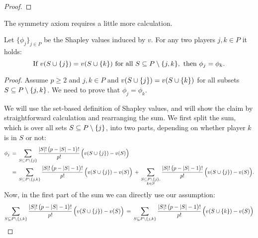 {\begin{enumerate}
\begin{proof}
    \end{proof}

    The symmetry axiom requires a little more calculation.

    \begin{theorem}[Symmetry]
    Let $\{\phi_j\}_{j \in P}$ be the Shapley values induced by $v$.
    For any two players $j,k \in P$  it holds:
    $$
    \text{If } v(S \cup \{j\}) = v(S \cup \{k\}) \text{ for all } S \subseteq P \setminus \{j,k\}, \text{ then } \phi_j = \phi_k.
    $$
    \end{theorem}

    \begin{proof}

        Assume $p \geq 2$ and $ j,k \in P$ and $v(S \cup \{j\}) = v(S \cup \{k\})$ for all subsets $S \subseteq P \setminus \{j,k\}$. We need to prove that $\phi_j = \phi_k$.
        
        We will use the set-based definition of Shapley values, and will show the claim by straightforward calculation and rearranging the sum.
        We first split the sum, which is over all sets $S \subseteq P \setminus \{j\}$, into two parts, depending on whether player $k$ is in $S$ or not:
        \begin{align*}
            \phi_j
            & \,=\, \sum_{S \subseteq P \setminus \{j\}} \frac{|S|!\,\bigl(p - |S| - 1\bigr)!}{p!} \, \Bigl( v(S \cup \{j\}) - v(S) \Bigr) \\
            & \,=\, \sum_{S \subseteq P \setminus \{j, k\}} \frac{|S|!\,\bigl(p - |S| - 1\bigr)!}{p!} \, \Bigl( v(S \cup \{j\}) - v(S) \Bigr) 
            \,+\, \sum_{\substack{S \subseteq P \setminus \{j\}, \\ k \in S}} \frac{|S|!\,\bigl(p - |S| - 1\bigr)!}{p!} \, \Bigl( v(S \cup \{j\}) - v(S) \Bigr).
        \end{align*}
        Now, in the first part of the sum we can directly use our assumption:
        $$
        \sum_{S \subseteq P \setminus \{j, k\}} \frac{|S|!\,\bigl(p - |S| - 1\bigr)!}{p!} \, \Bigl( v(S \cup \{j\}) - v(S) \Bigr)
        \,=\, \sum_{S \subseteq P \setminus \{j, k\}} \frac{|S|!\,\bigl(p - |S| - 1\bigr)!}{p!} \, \Bigl( v(S \cup \{k\}) - v(S) \Bigr)
        $$


\end{proof}
\end{enumerate}}
